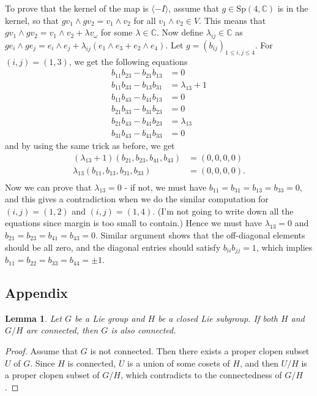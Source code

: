 \documentclass{article}
\newtheorem{lemma}{Lemma}
\newcommand{\Sp}{\mathrm{Sp}}
\begin{document}
To prove that the kernel of the map is $\langle -I\rangle$, assume that $g\in \Sp(4, \mathbb{C})$ is in the kernel, so that $gv_{1}\wedge gv_{2} = v_{1}\wedge v_{2}$ for all $v_{1}\wedge v_{2}\in V$. This means that $gv_{1}\wedge gv_{2}  = v_{1}\wedge v_{2} + \lambda v_{\omega}$ for some $\lambda \in \mathbb{C}$. 
Now define $\lambda_{ij}\in \mathbb{C}$ as $ge_{i}\wedge ge_{j} = e_{i}\wedge e_{j} + \lambda_{ij}(e_{1}\wedge e_{3} + e_{2}\wedge e_{4})$. Let $g = (b_{ij})_{1\leq i, j\leq 4}$. For $(i, j) = (1, 3)$,  we get the following equations
\begin{align*}
b_{11}b_{23}-b_{21}b_{13} &=0 \\
b_{11}b_{33}-b_{13}b_{31} &=\lambda_{13}+1 \\
b_{11}b_{43}-b_{41}b_{13} &=0\\
b_{21}b_{33}-b_{31}b_{23} &=0 \\
b_{21}b_{43}-b_{41}b_{23} &=\lambda_{13}\\
b_{31}b_{43}-b_{41}b_{33} &= 0
\end{align*}
and by using the same trick as before, we get 
\begin{align*}
(\lambda_{13}+1)(b_{21}, b_{23}, b_{41}, b_{43}) &= (0, 0, 0, 0) \\
\lambda_{13}(b_{11}, b_{13}, b_{31}, b_{33}) &= (0, 0, 0, 0). \\
\end{align*}
Now we can prove that $\lambda_{13}=0$ - if not, we must have $b_{11} = b_{31} = b_{13} = b_{33} =0$, and this gives a contradiction when we do the similar computation for $(i, j) = (1, 2)$ and $(i, j) = (1, 4)$. (I'm not going to write down all the equations since margin is too small to contain.) 
Hence we must have $\lambda_{13} =0$ and $b_{21} =b_{23} = b_{41} = b_{43} =0$. Similar argument shows that the off-diagonal elements should be all zero, and the diagonal entries should satisfy $b_{ii}b_{jj} = 1$, which implies $b_{11} = b_{22} = b_{33} = b_{44} = \pm 1$. 




\subsection{Appendix}

\begin{lemma}
\label{con}
Let $G$ be a Lie group and $H$ be a closed Lie subgroup. 
If both $H$ and $G/H$ are connected, then $G$ is also connected. 
\end{lemma}
\begin{proof}
Assume that $G$ is not connected. 
Then there exists a proper clopen subset $U$ of $G$. Since $H$ is connected, $U$ is a union of some cosets of $H$, and then $U/H$ is a proper clopen subset of $G/H$, which contradicts to the connectedness of $G/H$. 
\end{proof}
\end{document}
